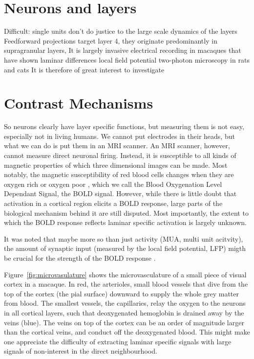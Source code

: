 \section*{Neurons and layers}
Difficult: single units don't do justice to the large scale dynamics of the layers
Feedforward projections target layer 4, they originate predominantly in supragranular layers, \cite{Felleman1991}
It is largely invasive electrical recording in macaques that have shown laminar differences
\cite{Buffalo2011}
\cite{VanKerkoerle2017}
local field potential \cite{Maier2010,Maier2011}
two-photon microscopy in rats and cats \cite{OHerron2016}
\cite{Logothetis2001}
It is therefore of great interest to investigate 
\cite{Lawrence2017}

\section*{Contrast Mechanisms}
So neurons clearly have layer specific functions, but measuring them is not easy, especially not in living humans. We cannot put electrodes in their heads, but what we can do is put them in an MRI scanner. An MRI scanner, however, cannot measure direct neuronal firing. Instead, it is susceptible to all kinds of magnetic properties of which three dimensional images can be made. Most notably, the magnetic susceptibility of red blood cells changes when they are oxygen rich or oxygen poor \cite{Ogawa1990}, which we call the Blood Oxygenation Level Dependant Signal, the BOLD signal. However, while there is little doubt that activation in a cortical region elicits a BOLD response, large parts of the biological mechanism behind it are still disputed. Most importantly, the extent to which the BOLD response reflects laminar specific activation is largely unknown. 

It was noted that maybe more so than just activity (MUA, multi unit acitvity), the amount of synaptic input (measured by the local field potential, LFP) migth be crucial for the strength of the BOLD response \cite{Goense2008}.


Figure~\ref{fig:microvasulature} shows the microvasculature of a small piece of visual cortex in a macaque. In red, the arterioles, small blood vessels that dive from the top of the cortex (the pial surface) downward to supply the whole grey matter from blood. The smallest vessels, the capillaries, relay the oxygen to the neurons in all cortical layers, such that deoxygenated hemoglobin is drained away by the veins (blue). The veins on top of the cortex can be an order of magnitude larger than the cortical veins, and conduct off the deoxygenated blood. This might make one appreciate the difficulty of extracting laminar specific signals with large signals of non-interest in the direct neighbourhood. 

